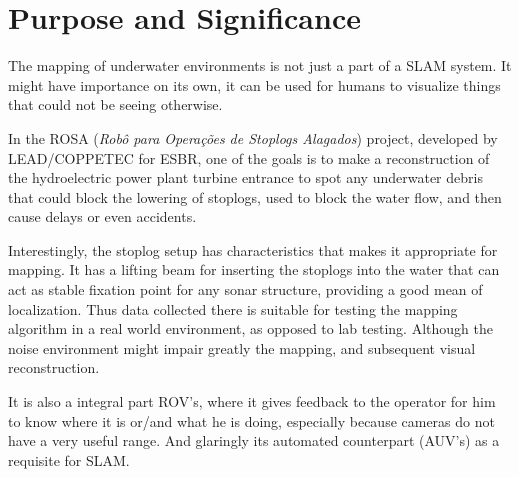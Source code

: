\section{Purpose and Significance}


The mapping of underwater environments is not just a part of a SLAM system. It
might have importance on its own, it can be used for humans to visualize things
that could not be seeing otherwise. 

In the ROSA (\textit{Robô para Operações de Stoplogs Alagados}) project,
developed by LEAD/COPPETEC for ESBR, one of the goals is to make a reconstruction
of the hydroelectric power plant turbine entrance to spot any underwater debris
that could block the lowering of stoplogs, used to block the water flow, and
then cause delays or even accidents.

Interestingly, the stoplog setup has
characteristics that makes it appropriate for mapping. It has a lifting beam for
inserting the stoplogs into the water that can act as stable fixation point for
any sonar structure, providing a good mean of localization.
Thus data collected there is suitable for testing the mapping
algorithm in a real world environment, as opposed to lab testing.
Although the noise environment might impair greatly the mapping, and subsequent
visual reconstruction.

It is also a integral part ROV's, where it gives feedback to the operator for
him to know where it is or/and what he is doing, especially because cameras do
not have a very useful range. And glaringly its automated counterpart (AUV's) as
a requisite for SLAM.
